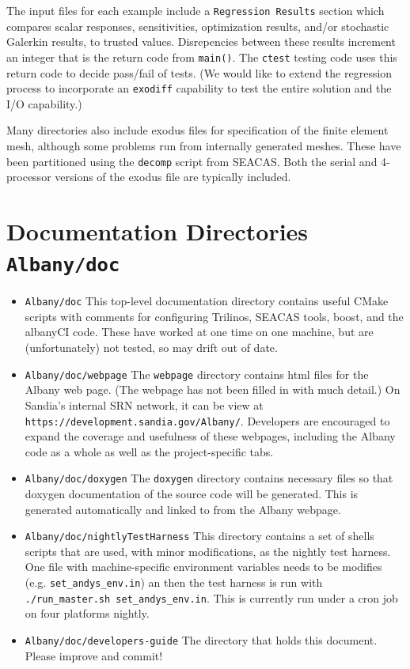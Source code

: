 \documentclass[pdf,12pt,report,strict]{SANDreport}
\theoremstyle{remark}
\begin{document}
The input files for each example include a \texttt{Regression Results} section which 
compares scalar responses, sensitivities, optimization results, and/or stochastic Galerkin
results, to trusted values. Disrepencies between these results increment an integer that
is the return code from \texttt{main()}. The \texttt{ctest} testing code uses this return
code to decide pass/fail of tests. (We would like to extend the regression process to
incorporate an \texttt{exodiff} capability to test the entire solution and the I/O 
capability.)

Many directories also include exodus files for specification of the finite element mesh,
although some problems run from internally generated meshes. These have been partitioned
using the \texttt{decomp} script from SEACAS. Both the serial and 4-processor versions
of the exodus file are typically included.

\section{Documentation Directories \texttt{Albany/doc} }

\begin{itemize}

\item{\texttt{Albany/doc}}  This top-level documentation directory contains
useful CMake scripts with comments for configuring Trilinos, SEACAS tools,
boost, and the albanyCI code. These have worked at one time on one machine,
but are (unfortunately) not tested, so may drift out of date.

\item{\texttt{Albany/doc/webpage}} The \texttt{webpage} directory contains
html files for the Albany web page. (The webpage has not been filled in with 
much detail.) On Sandia's internal SRN network, it can be view at
\texttt{https://development.sandia.gov/Albany/}. Developers are encouraged
to expand the coverage and usefulness of these webpages, including the
Albany code as a whole as well as the project-specific tabs. 

\item{\texttt{Albany/doc/doxygen}} The \texttt{doxygen} directory contains
necessary files so that doxygen documentation of the source code will be
generated. This is generated automatically and linked to from the Albany
webpage. 

\item{\texttt{Albany/doc/nightlyTestHarness}} This directory contains
a set of shells scripts that are used, with minor modifications, as
the nightly test harness. One file with machine-specific environment
variables needs to be modifies (e.g. \texttt{set\_andys\_env.in}) an then
the test harness is run with \texttt{./run\_master.sh set\_andys\_env.in}.
This is currently run under a cron job on four platforms nightly.

\item{\texttt{Albany/doc/developers-guide}} The directory that holds this
document. Please improve and commit!

\end{itemize}
\end{document}
